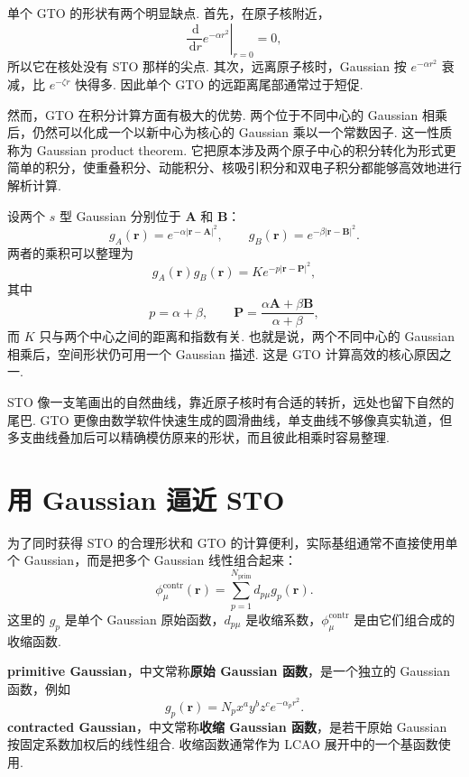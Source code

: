 \documentclass[UTF8,11pt,a4paper,openany]{ctexbook}
\newcommand{\dd}{\,\mathrm d}\newcommand{\Ham}{\hat H}\newcommand{\tr}{\operatorname{Tr}}
\newcommand{\term}[1]{\textbf{#1}}
\begin{document}
单个 GTO 的形状有两个明显缺点. 首先，在原子核附近，
\[
\left.\frac{\dd}{\dd r}e^{-\alpha r^2}\right|_{r=0}=0,
\]
所以它在核处没有 STO 那样的尖点. 其次，远离原子核时，Gaussian 按 $e^{-\alpha r^2}$ 衰减，比 $e^{-\zeta r}$ 快得多. 因此单个 GTO 的远距离尾部通常过于短促. 

然而，GTO 在积分计算方面有极大的优势. 两个位于不同中心的 Gaussian 相乘后，仍然可以化成一个以新中心为核心的 Gaussian 乘以一个常数因子. 这一性质称为 Gaussian product theorem. 它把原本涉及两个原子中心的积分转化为形式更简单的积分，使重叠积分、动能积分、核吸引积分和双电子积分都能够高效地进行解析计算. 

\begin{derivationbox}
设两个 $s$ 型 Gaussian 分别位于 $\mathbf A$ 和 $\mathbf B$：
\[
g_A(\mathbf r)=e^{-\alpha|\mathbf r-\mathbf A|^2},
\qquad
g_B(\mathbf r)=e^{-\beta|\mathbf r-\mathbf B|^2}.
\]
两者的乘积可以整理为
\[
g_A(\mathbf r)g_B(\mathbf r)
=
K e^{-p|\mathbf r-\mathbf P|^2},
\]
其中
\[
p=\alpha+\beta,
\qquad
\mathbf P=\frac{\alpha\mathbf A+\beta\mathbf B}{\alpha+\beta},
\]
而 $K$ 只与两个中心之间的距离和指数有关. 也就是说，两个不同中心的 Gaussian 相乘后，空间形状仍可用一个 Gaussian 描述. 这是 GTO 计算高效的核心原因之一. 
\end{derivationbox}

\begin{analogybox}
STO 像一支笔画出的自然曲线，靠近原子核时有合适的转折，远处也留下自然的尾巴. GTO 更像由数学软件快速生成的圆滑曲线，单支曲线不够像真实轨道，但多支曲线叠加后可以精确模仿原来的形状，而且彼此相乘时容易整理. 
\end{analogybox}

\section{用 Gaussian 逼近 STO}

为了同时获得 STO 的合理形状和 GTO 的计算便利，实际基组通常不直接使用单个 Gaussian，而是把多个 Gaussian 线性组合起来：
\[
\phi_\mu^{\mathrm{contr}}(\mathbf r)
=
\sum_{p=1}^{N_{\mathrm{prim}}}
d_{p\mu}g_p(\mathbf r).
\]
这里的 $g_p$ 是单个 Gaussian 原始函数，$d_{p\mu}$ 是收缩系数，$\phi_\mu^{\mathrm{contr}}$ 是由它们组合成的收缩函数. 

\begin{definitionbox}
\term{primitive Gaussian}，中文常称\term{原始 Gaussian 函数}，是一个独立的 Gaussian 函数，例如
\[
g_p(\mathbf r)=N_p x^a y^b z^c e^{-\alpha_p r^2}.
\]
\term{contracted Gaussian}，中文常称\term{收缩 Gaussian 函数}，是若干原始 Gaussian 按固定系数加权后的线性组合. 收缩函数通常作为 LCAO 展开中的一个基函数使用. 
\end{definitionbox}
\end{document}
